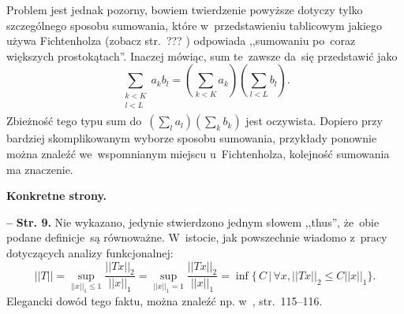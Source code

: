 \documentclass[a4paper,11pt]{article}
\newcommand{\spaceTwo}{2em}
\newcommand{\spaceFour}{0.5em}
\newcommand{\fr}{\frac}
\newcommand{\Sum}{\sum\limits}
\newcommand{\norm}[1]{\left|\left| #1 \right|\right|}
\newcommand{\tb}{\textbf}
\newcommand{\noi}{\noindent}
\newcommand{\start}{\noi \tb{--} {}}
\newcommand{\Str}[1]{\tb{Str. #1.}}
\begin{document}
Problem jest jednak pozorny, bowiem twierdzenie powyższe dotyczy tylko
szczególnego sposobu sumowania, które w~przedstawieniu tablicowym
jakiego używa Fichtenholza (zobacz str.~??? \cite{Fichtenholz05a})
odpowiada ,,sumowaniu po~coraz większych prostokątach''. Inaczej
mówiąc, sum te~zawsze da~się przedstawić jako
\begin{equation*}
  \Sum_{ \substack{ k < K \\ l < L \\ } } a_{ k } b_{ l }
  = ( \Sum_{ k < K } a_{ k } ) ( \Sum_{ l < L } b_{ l } ).
\end{equation*}
Zbieżność tego typu sum
do~$( \sum_{ l } a_{ l } ) ( \sum_{ k } b_{ k } )$ jest oczywista.
Dopiero przy bardziej skomplikowanym wyborze sposobu sumowania,
przykłady ponownie można znaleźć we~wspomnianym miejscu
u~Fichtenholza, kolejność sumowania ma znaczenie. %

\vspace{\spaceTwo}




\noi \tb{Konkretne strony.}

\vspace{\spaceFour}



\start \Str{9} Nie wykazano, jedynie stwierdzono jednym słowem
,,thus'', że~obie podane definicje~są równoważne. W~istocie, jak
powszechnie wiadomo z~pracy dotyczących analizy funkcjonalnej:
\begin{equation*}
  \norm{ T } = \sup_{ \norm{ x }_{ 1 } \leq 1 } \fr{ \norm{ T x }_{ 2 } }
  { \norm{ x }_{ 1 } }
  = \sup_{ \norm{ x }_{ 1 } = 1 } \fr{ \norm{ T x }_{ 2 } }
  { \norm{ x }_{ 1 } } = \inf \{ \, C \, | \, \forall x,
  \norm{ T x }_{ 2 } \leq C \norm{ x }_{ 1 } \}.
\end{equation*}
Elegancki dowód tego faktu, można znaleźć np.
w~\cite{ChmielinskiAnalizaFunkcjonalna04},
str.~115--116. %

\vspace{\spaceFour}
\end{document}
